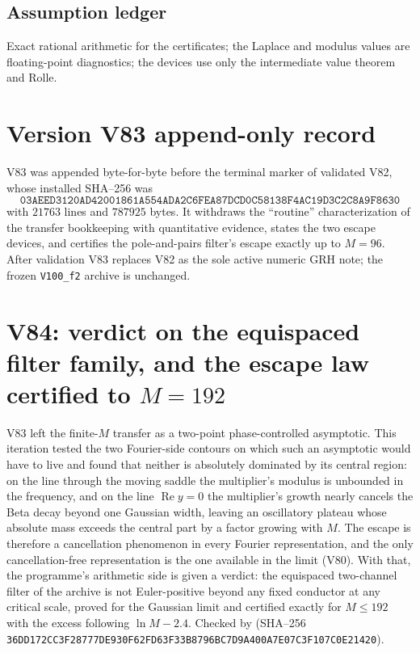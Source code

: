 \documentclass[11pt]{article}
\theoremstyle{definition}
\theoremstyle{remark}
\begin{document}
\subsection*{Assumption ledger}
\label{ass:f2v83}
Exact rational arithmetic for the certificates; the Laplace and modulus
values are floating-point diagnostics; the devices use only the
intermediate value theorem and Rolle.
\endgroup

\section*{Version V83 append-only record}

V83 was appended byte-for-byte before the terminal marker of validated
V82, whose installed SHA--256 was
\[
 \texttt{03AEED3120AD42001861A554ADA2C6FE}
 \allowbreak\texttt{A87DCD0C58138F4AC19D3C2C8A9F8630}
\]
with \(21763\) lines and \(787925\) bytes.  It withdraws the
``routine'' characterization of the transfer bookkeeping with
quantitative evidence, states the two escape devices, and certifies the
pole-and-pairs filter's escape exactly up to \(M=96\).  After validation
V83 replaces V82 as the sole active numeric GRH note; the frozen
\texttt{V100\_f2} archive is unchanged.





\clearpage
\section{V84: verdict on the equispaced filter family, and the escape law certified to \texorpdfstring{$M=192$}{M=192}}
\label{sec:f2v84-verdict}
\begingroup
\setcounter{equation}{0}
\renewcommand{\theequation}{N84.\arabic{equation}}
\renewcommand{\theHequation}{f2v84.\arabic{equation}}

V83 left the finite-\(M\) transfer as a two-point phase-controlled
asymptotic.  This iteration tested the two Fourier-side contours on
which such an asymptotic would have to live and found that neither is
absolutely dominated by its central region: on the line through the
moving saddle the multiplier's modulus is unbounded in the frequency,
and on the line \(\operatorname{Re}y=0\) the multiplier's growth nearly
cancels the Beta decay beyond one Gaussian width, leaving an oscillatory
plateau whose absolute mass exceeds the central part by a factor growing
with \(M\).  The escape is therefore a cancellation phenomenon in every
Fourier representation, and the only cancellation-free representation
is the one available in the limit (V80).  With that, the programme's
arithmetic side is given a verdict: the equispaced two-channel filter of
the archive is not Euler-positive beyond any fixed conductor at any
critical scale, proved for the Gaussian limit and certified exactly for
\(M\le192\) with the excess following \(\ln M-2.4\).  Checked by
 (SHA--256
\texttt{36DD172CC3F28777DE930F62FD63F33B}\allowbreak\texttt{8796BC7D9A400A7E07C3F107C0E21420}).
\end{document}
